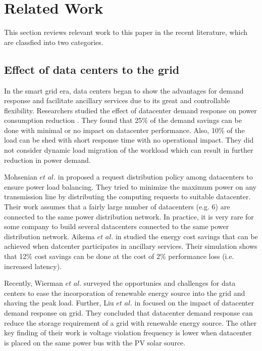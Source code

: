 \section{Related Work}
\label{sec:related}

This section reviews relevant work to this paper in the recent literature, which are classfied into two categories.

\subsection{Effect of data centers to the grid}

In the smart grid era, data centers began to show the advantages for demand response and facilitate ancillary services due to its great and controllable flexibility. Researchers studied the effect of datacenter demand response on power consumption reduction \cite{lbnl12shortstudy, lbnl12report}. They found that 25\% of the demand savings can be done with minimal or no impact on datacenter performance. Also, 10\% of the load can be shed with short response time with no operational impact. They did not consider dynamic load migration of the workload which can result in further reduction in power demand. 	

Mohsenian $\textit{et al.}$ in \cite{Mohsenian-Rad10grid} proposed a request distribution policy among datacenters to ensure power load balancing. They tried to minimize the maximum power on any transmission line by distributing the computing requests to suitable datacenter. Their work assumes that a fairly large number of datacenters (e.g. 6) are connected to the same power distribution network. In practice, it is very rare for some company to build several datacenters connected to the same power distribution network.  
Aikema $\textit{et al.}$ in \cite{Aikema12} studied the energy cost savings that can be achieved when datcenter participates in ancillary services. Their simulation shows that 12\% cost savings can be done at the cost of 2\% performance loss (i.e. increased latency).

Recently, Wierman $\textit{et al.}$ \cite{AdamWierman2014} surveyed the opportunies and challenges for data centers to ease the incorporation of renewable energy source into the grid and shaving the peak load. Further, Liu $\textit{et al.}$ in \cite{liu2014pricing} focused on the impact of datacenter demand response on grid. They concluded that datacenter demand response can reduce the storage requirement of a grid with renewable energy source. The other key finding of their work is voltage violation frequency is lower when datacenter is placed on the same power bus with the PV solar source.

